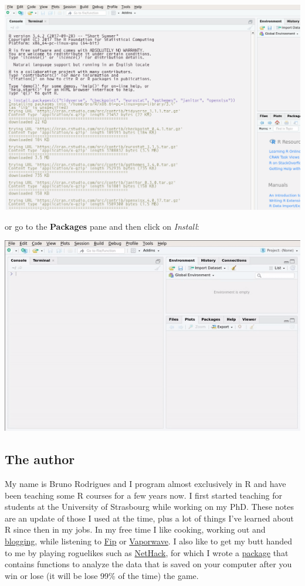 \documentclass[]{gitbook}
\begin{document}
\includegraphics{pics/install_packages.png}

or go to the \textbf{Packages} pane and then click on \emph{Install}:

\includegraphics{pics/rstudio_install_packages.gif}

\hypertarget{the-author}{%
\subsection*{The author}\label{the-author}}

My name is Bruno Rodrigues and I program almost exclusively in R and have been teaching some R
courses for a few years now. I first started teaching for students at the University of Strasbourg
while working on my PhD.
These notes are an update of those I used at the time, plus a lot of things I've learned about R
since then in my jobs.
In my free time I like cooking, working out and \href{https://www.brodrigues.co}{blogging}, while listening to
\href{http://www.fipradio.fr/player}{Fip} or \href{https://www.youtube.com/watch?v=u5qwtO_ABPM}{Vaporwave}.
I also like to get my butt handed to me by playing roguelikes
such as \href{http://nethack.wikia.com/wiki/NetHack}{NetHack}, for which I wrote a
\href{https://github.com/b-rodrigues/nethack}{package} that contains functions to analyze the data that
is saved on your computer after you win or lose (it will be lose 99\% of the time) the game.
\end{document}
